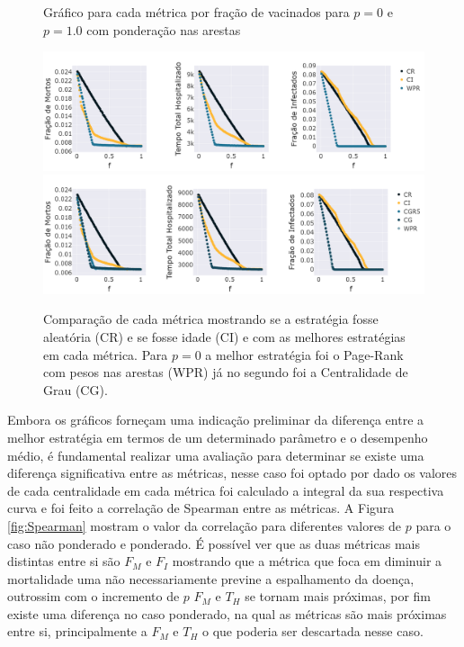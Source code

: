 \begin{figure}[H]
    \centering
    \captionsetup{font=normalsize,skip=0.8pt,singlelinecheck=on,labelsep=endash}
    \caption{Gráfico para cada métrica por fração de vacinados para $p = 0$ e $p = 1.0$ com ponderação nas arestas}
    \includegraphics[scale= 0.3]{figuras/compara_p_f_ponderado_0.0.png}
    \includegraphics[scale= 0.3]{figuras/compara_p_f_ponderado_1.0.png}

    \captionsetup{font=small,justification=justified}
    
    \caption*{ Comparação de cada métrica mostrando se a estratégia fosse aleatória (CR) e se fosse idade (CI) e com as melhores estratégias em cada métrica. Para $p = 0$ a melhor estratégia foi o Page-Rank com pesos nas arestas (WPR) já no segundo foi a Centralidade de Grau (CG). }
    \label{fig:resultados_metricas_ponderado}
\end{figure}

Embora os gráficos forneçam uma indicação preliminar da diferença entre a melhor estratégia em termos de um determinado parâmetro e o desempenho médio, é fundamental realizar uma avaliação para determinar se existe uma diferença significativa entre as métricas, nesse caso foi optado por dado os valores de cada centralidade em cada métrica foi calculado a integral da sua respectiva curva e foi feito a correlação de Spearman entre as métricas. A Figura \ref{fig:Spearman} mostram o valor da correlação para diferentes valores de $p$ para o caso não ponderado e ponderado. É possível ver que as duas métricas mais distintas entre si são $F_M$ e $F_I$ mostrando que a métrica que foca em diminuir a mortalidade uma não necessariamente previne a espalhamento da doença, outrossim com o incremento de $p$ $F_M$ e $T_H$ se tornam mais próximas, por fim existe uma diferença no caso ponderado, na qual as métricas são mais próximas entre si, principalmente a $F_M$ e $T_H$ o que poderia ser descartada nesse caso.


